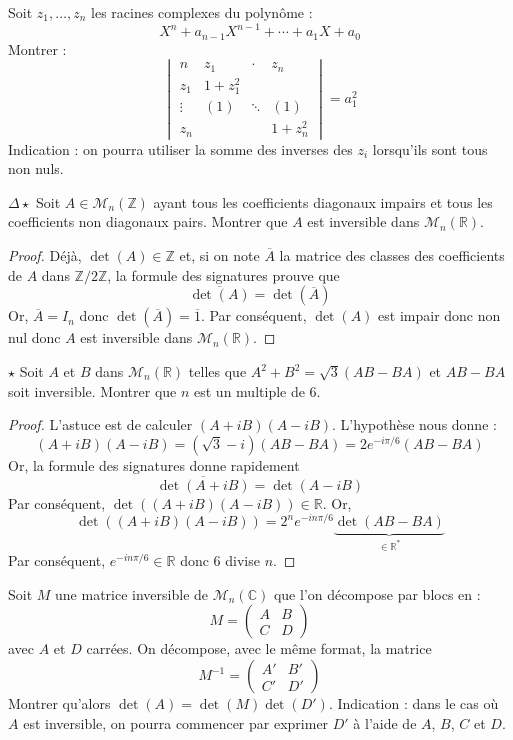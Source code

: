 \documentclass[french,a4paper]{article}
\newcommand{\Z}{\mathbb{Z}}
\newcommand{\R}{\mathbb{R}}
\newcommand{\C}{\mathbb{C}}
\newcommand{\st}{^*}
\newcommand{\inv}{^{-1}}
\theoremstyle{plain}
\theoremstyle{definition}
\theoremstyle{remark}
\begin{document}
\begin{ex}{}
	Soit $z_1,\ldots,z_n$ les racines complexes du polynôme : $$X^n+a_{n-1}X^{n-1}+\cdots+a_1X+a_0$$ Montrer : $$\begin{vmatrix}
		n&z_1&\cdot&z_n \\
		z_1&1+z_1^2&&\\
		\vdots&(1)&\ddots&(1)\\
		z_n&&&1+z_n^2
	\end{vmatrix}=a_1^2$$ Indication : on pourra utiliser la somme des inverses des $z_i$ lorsqu'ils sont tous non nuls.
\end{ex}

\begin{ex}{$\Delta\star$}
	Soit $A\in\mathcal{M}_n(\Z)$ ayant tous les coefficients diagonaux impairs et tous les coefficients non diagonaux pairs. Montrer que $A$ est inversible dans $\mathcal{M}_n(\R)$.
\end{ex}
\begin{proof}
	Déjà, $\det(A)\in\Z$ et, si on note $\overline{A}$ la matrice des classes des coefficients de $A$ dans $\Z/2\Z$,  la formule des signatures prouve que $$\overline{\det(A)}=\det(\overline{A})$$ Or, $\overline{A}=I_n$ donc $\det(\overline{A})=\overline{1}$. Par conséquent, $\det(A)$ est impair donc non nul donc $A$ est inversible dans $\mathcal{M}_n(\R)$.
\end{proof}

\begin{ex}{$\star$}
	Soit $A$ et $B$ dans $\mathcal{M}_n(\R)$ telles que $A^2+B^2=\sqrt{3}(AB-BA)$ et $AB-BA$ soit inversible. Montrer que $n$ est un multiple de $6$.
\end{ex}
\begin{proof}
	L'astuce est de calculer $(A+iB)(A-iB)$. L'hypothèse nous donne : $$(A+iB)(A-iB)=(\sqrt{3}-i)(AB-BA)=2e^{-i\pi/6}(AB-BA)$$ Or, la formule des signatures donne rapidement $$\overline{\det(A+iB)}=\det(A-iB)$$ Par conséquent, $\det((A+iB)(A-iB))\in\R$. Or, $$\det((A+iB)(A-iB))=2^ne^{-in\pi/6}\underbrace{\det(AB-BA)}_{\in\R\st}$$ Par conséquent, $e^{-in\pi/6}\in\R$ donc $6$ divise $n$.
\end{proof}

\begin{ex}{}
	Soit $M$ une matrice inversible de $\mathcal{M}_n(\C)$ que l'on décompose par blocs en : $$M=\begin{pmatrix}
		A&B\\
		C&D
	\end{pmatrix}$$ avec $A$ et $D$ carrées. On décompose, avec le même format, la matrice $$M\inv=\begin{pmatrix}
	A'&B'\\
	C'&D'
	\end{pmatrix}$$ Montrer qu'alors $\det(A)=\det(M)\det(D')$. Indication : dans le cas où $A$ est inversible, on pourra commencer par exprimer $D'$ à l'aide de $A$, $B$, $C$ et $D$.
\end{ex}
\end{document}
